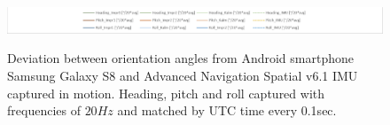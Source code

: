 \documentclass[review]{elsarticle}
\begin{document}
\begin{figure}[htbp!]
\begin{center}
		\begin{minipage}{\columnwidth} 
	 		\centering
	 	\end{minipage}
	 			
	 	\begin{minipage}{\columnwidth} 
	 		\centering
			
			\subfigure
			{\includegraphics[keepaspectratio, width=1\columnwidth]{graphics/Sensor_Galaxy_run1/sensor_diagramms_galaxys8_legend}						\label{fig:sensor_obs:s8:1st:legend}}
			
	 	\end{minipage}
\caption{Deviation between orientation angles from Android smartphone Samsung Galaxy S8 and Advanced Navigation Spatial v6.1 \gls{IMU} captured in motion. \textcolor{heading_green}{Heading}, \textcolor{pitch_orange}{pitch} and \textcolor{roll_blue}{roll} captured with frequencies of $20Hz$ and matched by UTC time every 0.1sec.}
	\label{fig:sensor_obs:s8:1st:motion}
\end{center}
\end{figure}
\end{document}
